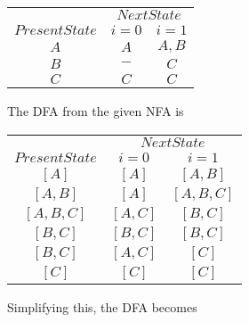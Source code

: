 \documentclass{article}
\begin{document}
\vspace*{0.4cm}
\begin{center}
\begin{tabular}{ccc}
 \hline

 \hline

 \hline

 \hline
 & \multicolumn{2}{c}{$Next State$}\\
 \cline{2-3}
 $Present State$ &  $i=0$ & $i=1$\\
\hline
 $A$   &   $A$      &  $A,B$ \\
 $B$   &   $-$      &  $C$   \\
 $C$   &   $C$      &  $C$   \\
 \hline

 \hline

 \hline

 \hline
\end{tabular}
\end{center}

The DFA from the given NFA is

\vspace*{0.4cm}
\begin{center}
\begin{tabular}{ccc}
 \hline

 \hline

 \hline

 \hline
 & \multicolumn{2}{c}{$Next State$}\\
 \cline{2-3}
 $Present State$ &  $i=0$ & $i=1$\\
\hline
     $[A]$     &    $[A]$   &    $[A, B]$  \\
   $[A, B]$    &    $[A]$   &  $[A, B, C]$ \\
 $[A, B, C]$   &  $[A, C]$  &   $[B, C]$   \\
  $[B, C]$     &  $[B, C]$  &   $[B, C]$   \\
 $[B, C]$      &  $[A, C]$  &    $[C]$    \\
  $[C]$        &   $[C]$    &    $[C]$    \\

\end{tabular}
\end{center}

Simplifying this, the DFA becomes
\end{document}
